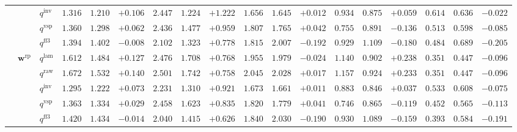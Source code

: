 \documentclass{article}
\begin{document}
\begin{table}[!htbp]
{\begin{tabular}{lll ccc ccc ccc ccc ccc}
 &  & $q^{\mathrm{inv}}$ & $1.316$ & $1.210$ & \cellcolor{posgreen!50}$+0.106$ & $2.447$ & $1.224$ & \cellcolor{posgreen!50}$+1.222$ & $1.656$ & $1.645$ & \cellcolor{posgreen!50}$+0.012$ & $0.934$ & $0.875$ & \cellcolor{posgreen!50}$+0.059$ & $0.614$ & $0.636$ & \cellcolor{negred!50}$-0.022$ \\
 &  & $q^{\mathrm{vsp}}$ & $1.360$ & $1.298$ & \cellcolor{posgreen!50}$+0.062$ & $2.436$ & $1.477$ & \cellcolor{posgreen!50}$+0.959$ & $1.807$ & $1.765$ & \cellcolor{posgreen!50}$+0.042$ & $0.755$ & $0.891$ & \cellcolor{negred!50}$-0.136$ & $0.513$ & $0.598$ & \cellcolor{negred!50}$-0.085$ \\
 &  & $q^{\mathrm{ff3}}$ & $1.394$ & $1.402$ & \cellcolor{negred!50}$-0.008$ & $2.102$ & $1.323$ & \cellcolor{posgreen!50}$+0.778$ & $1.815$ & $2.007$ & \cellcolor{negred!50}$-0.192$ & $0.929$ & $1.109$ & \cellcolor{negred!50}$-0.180$ & $0.484$ & $0.689$ & \cellcolor{negred!50}$-0.205$ \\
\cmidrule(lr){2-18}
 & $\mathbf{w}^{\mathrm{rp}}$ & $q^{\mathrm{lam}}$ & $1.612$ & $1.484$ & \cellcolor{posgreen!50}$+0.127$ & $2.476$ & $1.708$ & \cellcolor{posgreen!50}$+0.768$ & $1.955$ & $1.979$ & \cellcolor{negred!50}$-0.024$ & $1.140$ & $0.902$ & \cellcolor{posgreen!50}$+0.238$ & $0.351$ & $0.447$ & \cellcolor{negred!50}$-0.096$ \\
 &  & $q^{\mathrm{raw}}$ & $1.672$ & $1.532$ & \cellcolor{posgreen!50}$+0.140$ & $2.501$ & $1.742$ & \cellcolor{posgreen!50}$+0.758$ & $2.045$ & $2.028$ & \cellcolor{posgreen!50}$+0.017$ & $1.157$ & $0.924$ & \cellcolor{posgreen!50}$+0.233$ & $0.351$ & $0.447$ & \cellcolor{negred!50}$-0.096$ \\
 &  & $q^{\mathrm{inv}}$ & $1.295$ & $1.222$ & \cellcolor{posgreen!50}$+0.073$ & $2.231$ & $1.310$ & \cellcolor{posgreen!50}$+0.921$ & $1.673$ & $1.661$ & \cellcolor{posgreen!50}$+0.011$ & $0.883$ & $0.846$ & \cellcolor{posgreen!50}$+0.037$ & $0.533$ & $0.608$ & \cellcolor{negred!50}$-0.075$ \\
 &  & $q^{\mathrm{vsp}}$ & $1.363$ & $1.334$ & \cellcolor{posgreen!50}$+0.029$ & $2.458$ & $1.623$ & \cellcolor{posgreen!50}$+0.835$ & $1.820$ & $1.779$ & \cellcolor{posgreen!50}$+0.041$ & $0.746$ & $0.865$ & \cellcolor{negred!50}$-0.119$ & $0.452$ & $0.565$ & \cellcolor{negred!50}$-0.113$ \\
 &  & $q^{\mathrm{ff3}}$ & $1.420$ & $1.434$ & \cellcolor{negred!50}$-0.014$ & $2.040$ & $1.415$ & \cellcolor{posgreen!50}$+0.626$ & $1.840$ & $2.030$ & \cellcolor{negred!50}$-0.190$ & $0.930$ & $1.089$ & \cellcolor{negred!50}$-0.159$ & $0.393$ & $0.584$ & \cellcolor{negred!50}$-0.191$ \\
\bottomrule
\end{tabular}}
\end{table}
\end{document}

